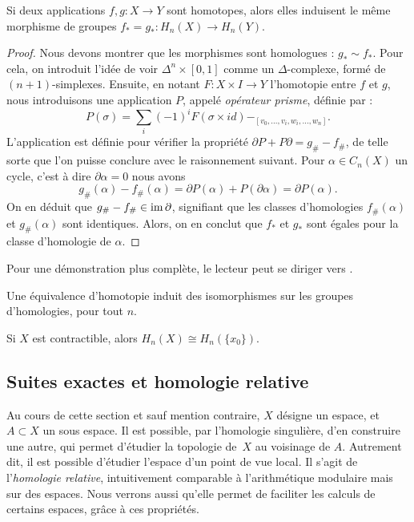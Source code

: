 \begin{theorem}
Si deux applications $f,g:X\to Y$ sont homotopes, alors elles induisent le même morphisme de groupes $f_\ast=g_\ast:H_n(X)\to H_n(Y)$.
\end{theorem}
\begin{proof}
Nous devons montrer que les morphismes sont homologues :  $g_\ast\sim f_\ast$. Pour cela, on introduit l'idée de voir $\Delta^n\times[0,1]$ comme un $\Delta$-complexe, formé de $(n+1)$-simplexes. Ensuite, en notant $F:X\times I\to Y$ l'homotopie entre $f$ et $g$, nous introduisons une application $P$, appelé \emph{opérateur prisme}, définie par : \[P(\sigma)=\sum_i (-1)^iF(\sigma\times i d)-_[v_0,...,v_i,w_i,...,w_n].\]L'application est définie pour vérifier la propriété $\partial P+P\partial = g_\#-f_\#$, de telle sorte que l'on puisse conclure avec le raisonnement suivant. Pour $\alpha\in C_n(X)$ un cycle, c'est à dire $\partial\alpha=0$ nous avons \[g_\#(\alpha)-f_\#(\alpha)=\partial P(\alpha)+P(\partial\alpha)=\partial P(\alpha).\] On en déduit que $g_\#-f_\#\in\mathrm{im}\,\partial$, signifiant que les classes d'homologies $f_\#(\alpha)$ et $g_\#(\alpha)$ sont identiques. Alors, on en conclut que $f_\ast$ et $g_\ast$ sont égales pour la classe d'homologie de $\alpha$.
\end{proof}

Pour une démonstration plus complète, le lecteur peut se diriger vers \cite[] [Theorem~2.10]{Hatcher}.

\begin{corollary}
Une équivalence d'homotopie induit des isomorphismes sur les groupes d'homologies, pour tout $n$.
\end{corollary}
\begin{exemple}
Si $X$ est contractible, alors $H_n(X)\cong H_n(\{x_0\})$.
\end{exemple}

\subsection{Suites exactes et homologie relative}

Au cours de cette section et sauf mention contraire, $X$ désigne un espace, et $A\subset X$ un sous espace. Il est possible, par l'homologie singulière, d'en construire une autre, qui permet d'étudier la topologie de~$X$ au voisinage de $A$. Autrement dit, il est possible d'étudier l'espace d'un point de vue local. Il s'agit de l'\emph{homologie relative}, intuitivement comparable à l'arithmétique modulaire mais sur des espaces. Nous verrons aussi qu'elle permet de faciliter les calculs de certains espaces, grâce à ces propriétés.

